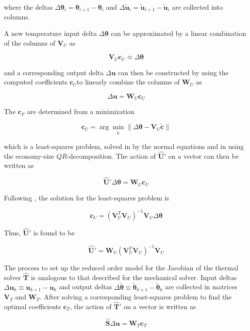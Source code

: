where the deltas $\Delta \boldsymbol \theta_i = \boldsymbol \theta_{i+1} - \boldsymbol \theta_i$ and $\Delta \tilde{\mathbf u}_i = \tilde{\mathbf u}_{i+1} -\tilde{\mathbf u}_i$ are collected into columns.

A new temperature input delta $\Delta \boldsymbol \theta$ can be approximated by a linear combination of the columns of $\mathbf V_U$ as

$$
\mathbf V_U\mathbf c_U\approx \Delta \boldsymbol\theta
$$

and a corresponding output delta $\Delta \mathbf u$ can then be constructed by using the computed coefficients $\mathbf c_U$to linearly combine the columns of $\mathbf W_U$ as

$$
\Delta\mathbf u = \mathbf W_U\mathbf c_U
$$

The $\mathbf c_F$ are determined from a minimization

$$
\mathbf c_U = \arg\min_{\tilde{\mathbf c} } \|\Delta\boldsymbol \theta - \mathbf V_U\tilde{\mathbf c}\|
$$

which is a least-squares problem, solved in \cite{vierendeels} by the normal equations and in \cite{} using the economy-size $QR$-decomposition. The action of $\hat{\mathbf U}'$ on a vector can then be written as

$$
\hat{\mathbf U}'\Delta\boldsymbol \theta = \mathbf W_U \mathbf c_U
$$

Following \cite{vierrendeels}, the solution for the least-squares problem is

$$
\mathbf c_U = (\mathbf V_U^T\mathbf V_U)^{-1}\mathbf V_U\Delta \boldsymbol \theta
$$

Thus, $\hat{\mathbf U}'$ is found to be

$$
\hat{\mathbf U}' = \mathbf W_U(\mathbf V_U^T \mathbf V_U)^{-1}\mathbf V_U
$$

The process to set up the reduced order model for the Jacobian of the thermal solver $\hat{\mathbf T}$ is analogous to that described for the mechanical solver. Input deltas $\Delta \mathbf u_k \equiv \mathbf u_{k+1} - \mathbf u_k$ and output deltas $\Delta\tilde{\boldsymbol \theta} \equiv \tilde{\boldsymbol \theta}_{k+1} - \tilde{\boldsymbol \theta}_k$ are collected in matrices $\mathbf V_T$ and $\mathbf W_T$. After solving a corresponding least-squares problem to find the optimal coefficients $\mathbf c_T$, the action of $\hat{\mathbf T}'$ on a vector is written as

$$
\hat{\mathbf S}\Delta \mathbf u = \mathbf W_T\mathbf c_T
$$

